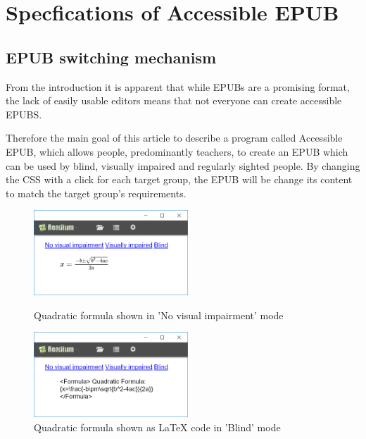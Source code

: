 \documentclass{llncs}
\begin{document}
\section{Specfications of Accessible EPUB}

\subsection{EPUB switching mechanism}

From the introduction it is apparent that while EPUBs are a promising format, the lack of easily usable editors means that not everyone can create accessible EPUBS.

Therefore the main goal of this article to describe a program called Accessible EPUB, which allows people, predominantly teachers, to create an EPUB which can be used by blind, visually impaired and regularly sighted people. By changing the CSS with a click for each target group, the EPUB will be change its content to match the target group's requirements. 



\begin{figure}
	\centering
	\begin{minipage}{0.45\textwidth}
		\centering
			\includegraphics[width=58mm]{EquationNormal2.png} 
		\caption{Quadratic formula shown in 'No visual impairment' mode}
	\end{minipage}\hfill
	\begin{minipage}{0.45\textwidth}
		\centering
			\includegraphics[width=58mm]{EquationLatex2.png} 
		\caption{Quadratic formula shown as LaTeX code in 'Blind' mode}
	\end{minipage}

\end{figure}
\end{document}
